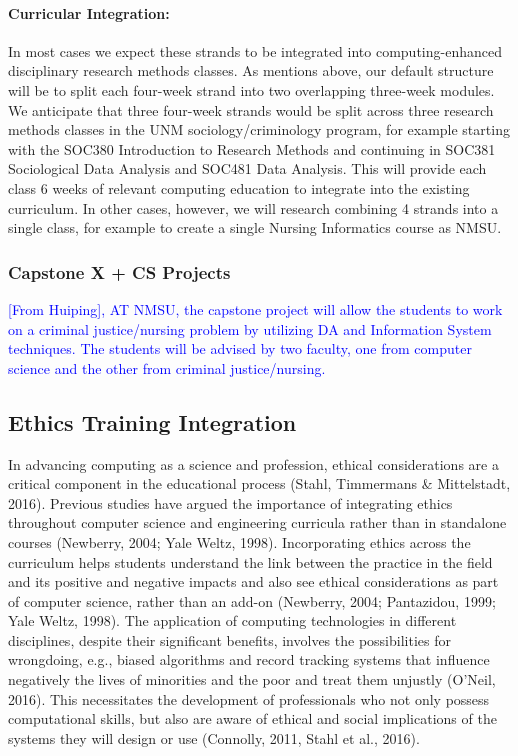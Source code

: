\paragraph{Curricular Integration:} In most cases we expect these strands to be integrated into computing-enhanced disciplinary research methods classes. As mentions above, our default structure will be to split each four-week strand into two overlapping three-week modules. We anticipate that three four-week strands would be split across three research methods classes in the UNM sociology/criminology program, for example starting with the SOC380 Introduction to Research Methods and continuing in SOC381 Sociological Data Analysis
 and SOC481 Data Analysis. This will provide each class 6 weeks of relevant computing education to integrate into the existing curriculum. In other cases, however, we will research combining 4 strands into a single class, for example to create a single Nursing Informatics course as NMSU. 

\subsubsection{Capstone X + CS Projects}

\textcolor{blue}{[From Huiping], AT NMSU, the capstone project will allow the students to work on a criminal justice/nursing problem by utilizing DA and Information System techniques. The students will be advised by two faculty, one from computer science and the other from criminal justice/nursing.
}

\subsection{Ethics Training Integration}
In advancing computing as a science and profession, ethical considerations are a critical component in the educational process (Stahl, Timmermans \& Mittelstadt, 2016). Previous studies have argued the importance of integrating ethics throughout computer science and engineering curricula rather than in standalone courses (Newberry, 2004; Yale Weltz, 1998). Incorporating ethics across the curriculum helps students understand the link between the practice in the field and its positive and negative impacts and also see ethical considerations as part of computer science, rather than an add-on (Newberry, 2004; Pantazidou, 1999; Yale Weltz, 1998). The application of computing technologies in different disciplines, despite their significant benefits, involves the possibilities for wrongdoing, e.g., biased algorithms and record tracking systems that influence negatively the lives of minorities and the poor and treat them unjustly (O’Neil, 2016). This necessitates the development of professionals who not only possess computational skills, but also are aware of ethical and social implications of the systems they will design or use (Connolly, 2011, Stahl et al., 2016).

